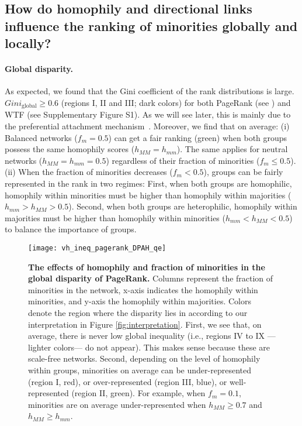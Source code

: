 \documentclass[fleqn,10pt]{wlscirep}
\begin{document}
\subsection*{How do homophily and directional links influence the ranking of minorities globally and locally?}

\paragraph{Global disparity.} %

As expected, we found that the Gini coefficient of the rank distributions is large.
$Gini_\text{global}\geq 0.6$ (regions I, II and III; dark colors) for both PageRank (see ) and WTF (see Supplementary Figure S1). 
As we will see later, this is mainly due to the preferential attachment mechanism~\cite{pandurangan2002using, fortunato2007local}.
Moreover, we find that on average: (i) Balanced networks ($f_m=0.5$) can get a fair ranking (green) when both groups possess the same homophily scores ($h_{MM}=h_{mm}$). The same applies for neutral networks ($h_{MM}=h_{mm}=0.5$) regardless of their fraction of minorities ($f_m\leq0.5$).
(ii) When the fraction of minorities decreases ($f_m<0.5$), groups can be fairly represented in the rank in two regimes: First, when both groups are homophilic, homophily within minorities must be higher than homophily within majorities ($h_{mm}>h_{MM}>0.5$). Second, when both groups are heterophilic, homophily within majorities must be higher than homophily within minorities ($h_{mm}<h_{MM}<0.5$) to balance the importance of groups.



\begin{figure}[t!]
    \centering
    \texttt{[image: vh\_ineq\_pagerank\_DPAH\_qe]}
    \caption{\textbf{The effects of homophily and fraction of minorities in the global disparity of PageRank.} Columns represent the fraction of minorities in the network, x-axis indicates the homophily within minorities, and y-axis the homophily within majorities. 
    Colors denote the region where the disparity lies in according to our interpretation in Figure \ref{fig:interpretation}.
    First, we see that, on average, there is never low global inequality (i.e., regions IV to IX ---lighter colors--- do not appear). This makes sense because these are scale-free networks. Second, depending on the level of homophily within groups, minorities on average can be under-represented (region I, red), or over-represented (region III, blue), or well-represented (region II, green). For example, when $f_{m}=0.1$, minorities are on average under-represented when $h_{MM}\geq 0.7$ and $h_{MM}\geq h_{mm}$.}
    \label{fig:vh_pagerank_DBAH}
\end{figure}
\end{document}
